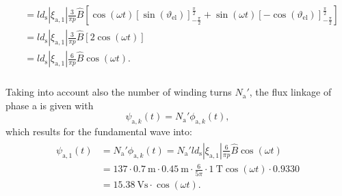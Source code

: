 \begin{solutionblock}
\begin{align}
\begin{split}
                                   & = l d_{\mathrm{s}} |\xi_{\mathrm{a},1}|
            \frac{3}{\pi p} \hat{B}
            \left[\cos(\omega t) \left[\sin(\vartheta_{\mathrm{el}}) \right]_{-\frac{\pi}{2}}^{\frac{\pi}{2}} + \sin(\omega t) \left[-\cos(\vartheta_{\mathrm{el}}) \right]_{-\frac{\pi}{2}}^{\frac{\pi}{2}} \right]                                                   \\
                                   & = l d_{\mathrm{s}} |\xi_{\mathrm{a},1}|
            \frac{3}{\pi p} \hat{B} \left[ 2 \cos(\omega t)\right]                                                                                                                                                                                                     \\
                                   & = l d_{\mathrm{s}} |\xi_{\mathrm{a},1}|
            \frac{6}{\pi p} \hat{B} \cos(\omega t).                                                                                                                                                                                                                    \\
        \end{split}
    \end{align}

    Taking into account also the number of winding turns $N_{\mathrm{a}}'$, the flux linkage of phase a is given with
    \begin{equation}
        \psi_{\mathrm{a,}k}(t) = N_{\mathrm{a}}' \phi_{\mathrm{a,}k}(t),
        \label{eq:psi_a_k_concentrated}
    \end{equation}
    which results for the fundamental wave into:
    \begin{align}
        \begin{split}
            \psi_{\mathrm{a,}1}(t) & = N_{\mathrm{a}}' \phi_{\mathrm{a,}k}(t)
            = N_{\mathrm{a}}' l d_{\mathrm{s}} |\xi_{\mathrm{a},1}| \frac{6}{\pi p} \hat{B} \cos(\omega t)                                                      \\
                                   & = 137 \cdot \SI{0.7}{\metre} \cdot \SI{0.45}{\metre} \cdot \frac{6}{5\pi} \cdot \SI{1}{\tesla} \cos(\omega t) \cdot 0.9330 \\
                                   & = \SI{15.38}{\volt\second} \cdot \cos(\omega t).
        \end{split}
    \end{align}


\end{solutionblock}
